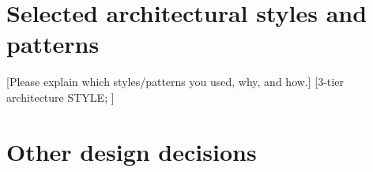 \clearpage%
\section{Selected architectural styles and patterns}\label{sec:styles}
[Please explain which styles/patterns you used, why, and how.] [3-tier architecture STYLE; ]















\clearpage%
\section{Other design decisions}\label{sec:decisions}
\lipsum[8]

